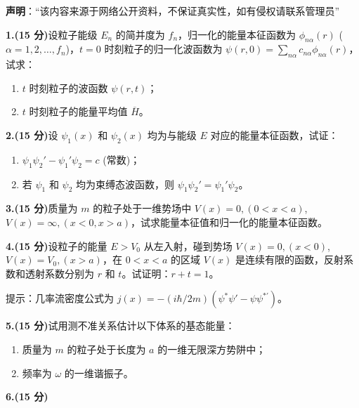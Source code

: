 
\textbf{声明}：“该内容来源于网络公开资料，不保证真实性，如有侵权请联系管理员”

\textbf{1.(15 分)}设粒子能级 $E_n$ 的简并度为 $f_n$，归一化的能量本征函数为 $\phi_{n\alpha}(r)$ ($\alpha = 1,2,\dots,f_n$)，$t = 0$ 时刻粒子的归一化波函数为 $\psi(r,0) = \sum_{n\alpha} c_{n\alpha} \phi_{n\alpha}(r)$，试求：

\begin{enumerate}
    \item $t$ 时刻粒子的波函数 $\psi(r,t)$；
    \item $t$ 时刻粒子的能量平均值 $ \overline{H} $。
\end{enumerate}

\textbf{2.(15 分)}设 $\psi_1(x)$ 和 $\psi_2(x)$ 均为与能级 $E$ 对应的能量本征函数，试证：
\begin{enumerate}
    \item $\psi_1 \psi_2' - \psi_1' \psi_2 = c$ (常数)；
    \item 若 $\psi_1$ 和 $\psi_2$ 均为束缚态波函数，则 $\psi_1 \psi_2' = \psi_1' \psi_2$。
\end{enumerate}

\textbf{3.(15 分)}质量为 $m$ 的粒子处于一维势场中 $V(x) = 0, (0 < x < a)$, $V(x) = \infty, (x < 0, x > a)$，试求能量本征值和归一化的能量本征函数。

\textbf{4.(15 分)}设粒子的能量 $E > V_0$ 从左入射，碰到势场 $V(x) = 0, (x < 0)$, $V(x) = V_0, (x > a)$，在 $0 < x < a$ 的区域 $V(x)$ 是连续有限的函数，反射系数和透射系数分别为 $r$ 和 $t$。试证明：$r + t = 1$。

提示：几率流密度公式为 $j(x) = -(i\hbar/2m)(\psi^*\psi'  - \psi\psi^{*'})$。

\textbf{5.(15 分)}试用测不准关系估计以下体系的基态能量：
\begin{enumerate}
    \item 质量为 $m$ 的粒子处于长度为 $a$ 的一维无限深方势阱中；
    \item 频率为 $\omega$ 的一维谐振子。
\end{enumerate}

\textbf{6.(15 分)}